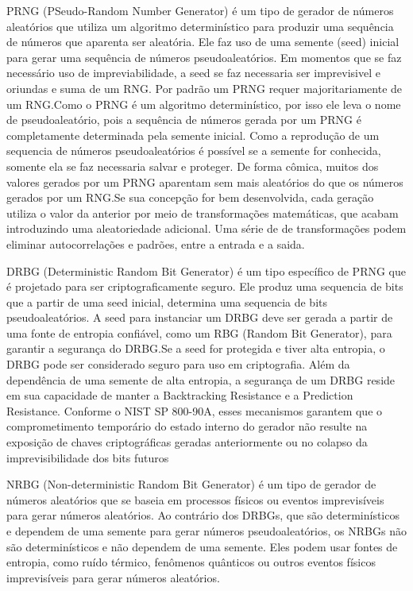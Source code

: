         PRNG (PSeudo-Random Number Generator) é um tipo de gerador de números aleatórios que utiliza um algoritmo determinístico para produzir uma sequência de números que aparenta ser aleatória.
        Ele faz uso de uma semente (seed) inicial para gerar uma sequência de números pseudoaleatórios. Em momentos que se faz necessário uso de impreviabilidade, a seed se faz necessaria ser imprevisivel e oriundas e suma de um RNG.\@
        Por padrão um PRNG requer majoritariamente de um RNG.\@ Como o PRNG é um algoritmo determinístico, por isso ele leva o nome de pseudoaleatório, pois a sequência de números gerada por um PRNG é completamente determinada pela semente inicial.
        Como a reprodução de um sequencia de números pseudoaleatórios é possível se a semente for conhecida, somente ela se faz necessaria salvar e proteger. 
        De forma cômica, muitos dos valores gerados por um PRNG aparentam sem mais aleatórios do que os números gerados por um RNG.\@ Se sua concepção for bem desenvolvida, cada geração utiliza o valor da anterior por meio de transformações matemáticas, 
        que acabam introduzindo uma aleatoriedade adicional. Uma série de de transformações podem eliminar autocorrelações e padrões, entre a entrada e a saida.%

        DRBG (Deterministic Random Bit Generator) é um tipo específico de PRNG que é projetado para ser criptograficamente seguro. Ele produz uma sequencia de bits que a partir de uma seed inicial, determina uma sequencia de bits pseudoaleatórios. 
        A seed para instanciar um DRBG deve ser gerada a partir de uma fonte de entropia confiável, como um RBG (Random Bit Generator), para garantir a segurança do DRBG.\@ Se a seed for protegida e tiver alta entropia, o DRBG pode ser considerado seguro para uso em criptografia.
        Além da dependência de uma semente de alta entropia, a segurança de um DRBG reside em sua capacidade de manter a Backtracking Resistance e a Prediction Resistance. 
        Conforme o NIST SP 800-90A, esses mecanismos garantem que o comprometimento temporário do estado interno do gerador não resulte na exposição de chaves criptográficas geradas anteriormente ou no colapso da imprevisibilidade dos bits futuros

        NRBG (Non-deterministic Random Bit Generator) é um tipo de gerador de números aleatórios que se baseia em processos físicos ou eventos imprevisíveis para gerar números aleatórios.
        Ao contrário dos DRBGs, que são determinísticos e dependem de uma semente para gerar números pseudoaleatórios, os NRBGs não são determinísticos e não dependem de uma semente. 
        Eles podem usar fontes de entropia, como ruído térmico, fenômenos quânticos ou outros eventos físicos imprevisíveis para gerar números aleatórios.

